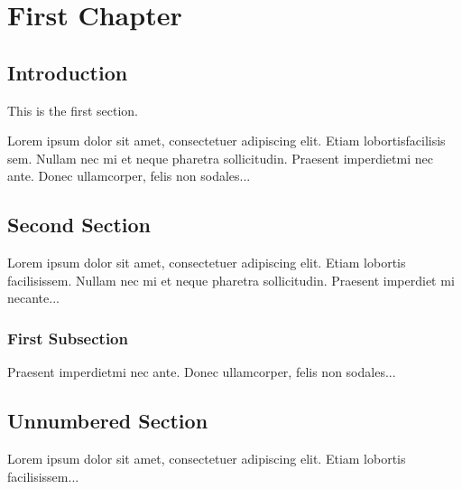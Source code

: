 \documentclass{book}
\begin{document}
\chapter{First Chapter}

\section{Introduction}

This is the first section.

Lorem  ipsum  dolor  sit  amet,  consectetuer  adipiscing  
elit. Etiam  lobortisfacilisis sem.  Nullam nec mi et 
neque pharetra sollicitudin.  Praesent imperdietmi nec ante. 
Donec ullamcorper, felis non sodales...

\section{Second Section}

Lorem ipsum dolor sit amet, consectetuer adipiscing elit.  
Etiam lobortis facilisissem.  Nullam nec mi et neque pharetra 
sollicitudin.  Praesent imperdiet mi necante...

\subsection{First Subsection}
Praesent imperdietmi nec ante. Donec ullamcorper, felis non sodales...

\section*{Unnumbered Section}
Lorem ipsum dolor sit amet, consectetuer adipiscing elit.  
Etiam lobortis facilisissem...
\end{document}

